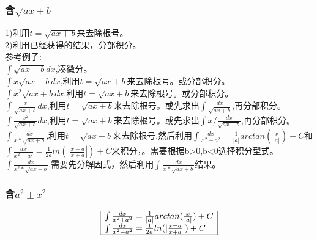 \documentclass[fleqn]{article}
\begin{document}
\begin{flushleft}
		\subsubsection{含$\sqrt{ax+b}$}
		1)利用$t=\sqrt{ax+b}$来去除根号。\\
		2)利用已经获得的结果，分部积分。\\
		参考例子:\\
			$\int \sqrt{ax+b}dx$,凑微分。\\ 
			$\int x\sqrt{ax+b}dx$,利用$t=\sqrt{ax+b}$来去除根号。或分部积分。\\ 
			$\int x^2\sqrt{ax+b}dx$,利用$t=\sqrt{ax+b}$来去除根号。或分部积分。\\ 
			$\int \frac{x}{\sqrt{ax+b}}dx$,利用$t=\sqrt{ax+b}$来去除根号。或先求出$\int \frac{dx}{\sqrt{ax+b}}$,再分部积分。\\ 
			$\int \frac{x^2}{\sqrt{ax+b}}dx$,利用$t=\sqrt{ax+b}$来去除根号。或先求出$\int x/\frac{dx}{\sqrt{ax+b}}$,再分部积分。\\ 
			$\int \frac{dx}{x*\sqrt{ax+b}}$,利用$t=\sqrt{ax+b}$来去除根号,然后利用$\int\frac{dx}{x^2+a^2}=\frac{1}{|a|}arctan(\frac{x}{|a|})+C $和$\int\frac{dx}{x^2-a^2}=\frac{1}{2a}ln(|\frac{x-a}{x+a}|)+C$来积分，。需要根据b>0,b<0选择积分型式。\\ 
			$\int \frac{dx}{x^2*\sqrt{ax+b}}$,需要先分解因式，然后利用$\int \frac{dx}{x*\sqrt{ax+b}}$结果。\\

		\subsubsection{含$a^2 \pm x^2$}	
		\[
		\begin{array}{|l|}
			\hline
			\int\frac{dx}{x^2+a^2}=\frac{1}{|a|}arctan(\frac{x}{|a|})+C \\
			\int\frac{dx}{x^2-a^2}=\frac{1}{2a}ln(|\frac{x-a}{x+a}|)+C \\
			\hline
		\end{array}
		\]

\end{flushleft}
\end{document}
